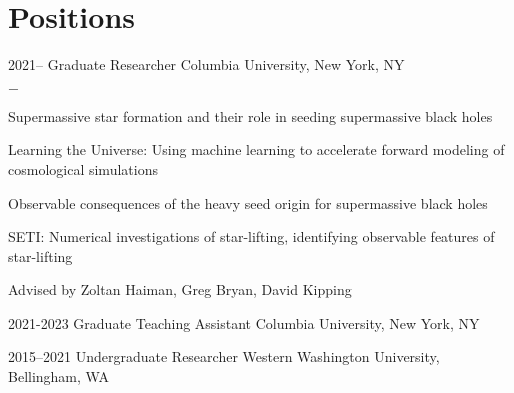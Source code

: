 \documentclass[]{scoggins-cv} %
\begin{document}
\vspace{-0.5cm}

\section{Positions}

\begin{entrylist}
    \entry
    {2021--}
    {Graduate Researcher}
    {Columbia University, New York, NY}
    {%
        \vspace{-1em}
        \begin{list}{{\color{numcolor}$-$}}{\cvlist}
	  \item Supermassive star formation and their role in seeding supermassive black holes
          \item Learning the Universe: Using machine learning to accelerate forward modeling of cosmological simulations
          \item Observable consequences of the heavy seed origin for supermassive black holes
          \item SETI: Numerical investigations of star-lifting, identifying observable features of star-lifting

          \item Advised by Zoltan Haiman, Greg Bryan, David Kipping
        \end{list}
    }


  \entry
  {2021-2023}
  {Graduate Teaching Assistant}
  {Columbia University, New York, NY}
  {%
  }

    \entry
    {2015--2021}
    {Undergraduate Researcher}
    {Western Washington University, Bellingham, WA}
    {%
    }

\end{entrylist}
\end{document}

